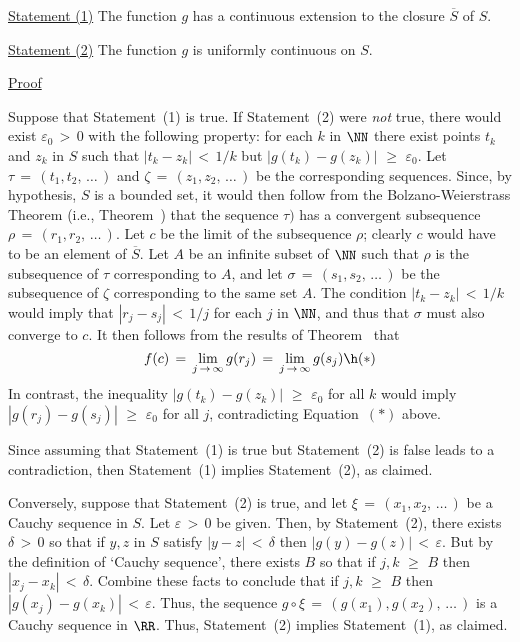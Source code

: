 \V

        \underline{Statement (1)} The function $g$ has a continuous extension to the closure $\overline{S}$ of $S$.

\V

        \underline{Statement (2)} The function $g$ is uniformly continuous on $S$.

\V

        \underline{Proof}

\V

        Suppose that Statement~(1) is true.
    If Statement~(2) were {\em not} true, there would exist ${\varepsilon}_{0}\,>\,0$ with the following property:
    for each $k$ in ${\NN}$ there exist points $t_{k}$ and $z_{k}$ in $S$ such that $|t_{k}-z_{k}|\,<\,1/k$ but $|g(t_{k})-g(z_{k})|\,\,{\geq}\,\,{\varepsilon}_{0}$.
    Let ${\tau} \,=\, (t_{1},t_{2},\,{\ldots}\,)$ and ${\zeta} \,=\, (z_{1},z_{2},\,{\ldots}\,)$ be the corresponding sequences.
    Since, by hypothesis, $S$ is a bounded set, it would then follow from the Bolzano-Weierstrass Theorem (i.e., Theorem~)
    that the sequence ${\tau})$ has a convergent subsequence ${\rho} \,=\, (r_{1},r_{2},\,{\ldots}\,)$.
    Let $c$ be the limit of the subsequence ${\rho}$; clearly $c$ would have to be an element of $\overline{S}$.
    Let $A$ be an infinite subset of ${\NN}$ such that ${\rho}$ is the subsequence of ${\tau}$ corresponding to $A$,
    and let ${\sigma} \,=\, (s_{1},s_{2},\,{\ldots}\,)$ be the subsequence of ${\zeta}$ corresponding to the same set $A$.
    The condition $|t_{k}-z_{k}|\,<\,1/k$ would imply that $|r_{j}-s_{j}|\,<\,1/j$ for each $j$ in ${\NN}$, and thus that ${\sigma}$ must also converge to $c$.
    It then follows from the results of Theorem~ that
        \begin{displaymath}
        f(c) \,=\, \lim_{j \,{\rightarrow}\, {\infty}} g(r_{j}) \,=\, \lim_{j \,{\rightarrow}\, {\infty}} g(s_{j}) \h ({\ast})
        \end{displaymath}
    In contrast, the inequality $|g(t_{k})-g(z_{k})|\,\,{\geq}\,\,{\varepsilon}_{0}$ for all $k$ would imply $|g(r_{j})-g(s_{j})|\,\,{\geq}\,\,{\varepsilon}_{0}$ for all $j$, contradicting Equation~$({\ast})$ above.

        Since assuming that Statement~(1) is true but Statement~(2) is false leads to a contradiction, then Statement~(1) implies Statement~(2), as claimed.

\V

        Conversely, suppose that Statement~(2) is true, and let ${\xi} \,=\, (x_{1},x_{2},\,{\ldots}\,)$ be a Cauchy sequence in $S$.
    Let ${\varepsilon}\,>\,0$ be given. Then, by Statement~(2), there exists ${\delta}\,>\,0$ so that if $y,z$ in $S$ satisfy $|y-z|\,<\,{\delta}$ then $|g(y)-g(z)|\,<\,{\varepsilon}$.
    But by the definition of `Cauchy sequence', there exists $B$ so that if $j,k\,\,{\geq}\,\,B$ then $|x_{j}-x_{k}|\,<\,{\delta}$.
    Combine these facts to conclude that if $j,k\,\,{\geq}\,\,B$ then $|g(x_{j})-g(x_{k})|\,<\,{\varepsilon}$.
    Thus, the sequence $g{\circ}{\xi} \,=\, (g(x_{1}),g(x_{2}),\,{\ldots}\,)$ is a Cauchy sequence in ${\RR}$.
    Thus, Statement~(2) implies Statement~(1), as claimed.


